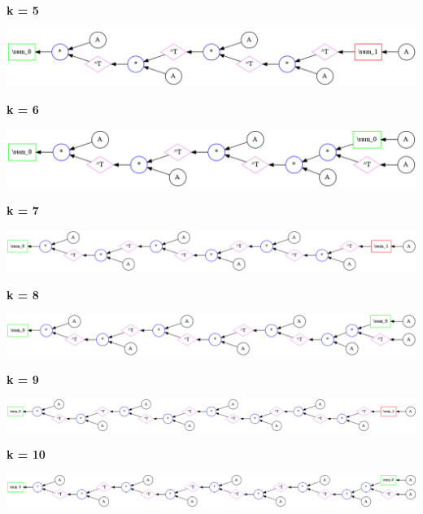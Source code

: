 {\bf k = 5}


\begin{center}
\includegraphics[width=0.45\linewidth]{trees/SumAAT_5_horizontal_0.png}
\end{center}


{\bf k = 6}


\begin{center}
\includegraphics[width=0.45\linewidth]{trees/SumAAT_6_horizontal_0.png}
\end{center}


{\bf k = 7}


\begin{center}
\includegraphics[width=0.45\linewidth]{trees/SumAAT_7_horizontal_0.png}
\end{center}


{\bf k = 8}


\begin{center}
\includegraphics[width=0.45\linewidth]{trees/SumAAT_8_horizontal_0.png}
\end{center}


{\bf k = 9}


\begin{center}
\includegraphics[width=0.45\linewidth]{trees/SumAAT_9_horizontal_0.png}
\end{center}


{\bf k = 10}


\begin{center}
\includegraphics[width=0.45\linewidth]{trees/SumAAT_10_horizontal_0.png}
\end{center}



